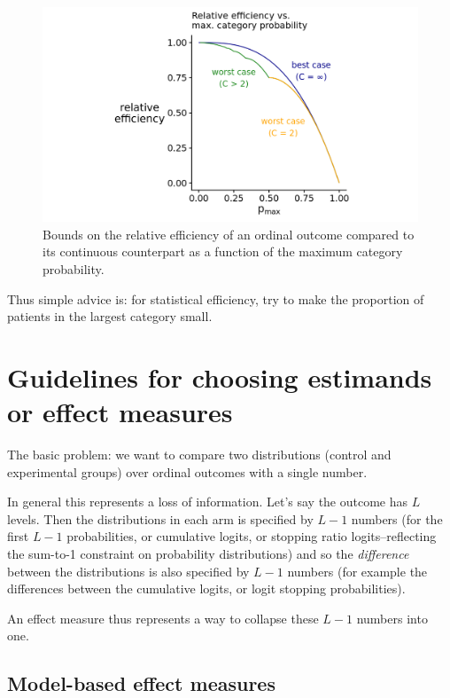 \documentclass[
  11pt,
  fleqn
]{article}
\begin{document}
\begin{figure}
  \includegraphics[width=6in]{p_max_controls_efficiency.png}
  \caption{Bounds on the relative efficiency of an ordinal outcome
    compared to its continuous counterpart as a function of the maximum
  category probability.}
  \label{fig:p_max}
\end{figure}

Thus simple advice is: for statistical efficiency, try to make the proportion
of patients in the largest category small.

\section{Guidelines for choosing estimands or effect measures}

The basic problem: we want to compare two distributions (control and
experimental groups) over ordinal outcomes with a single number.

In general this represents a loss of information. Let's say the
outcome has $L$ levels. Then the distributions in each
arm is specified by $L-1$ numbers (for the first $L-1$ probabilities,
  or cumulative logits, or stopping ratio logits--reflecting the
sum-to-1 constraint on probability distributions) and so the
\emph{difference} between the distributions is also specified by
$L-1$ numbers (for example the differences between the cumulative
logits, or logit stopping probabilities).

An effect measure thus represents a way to collapse these $L-1$
numbers into one.

\subsection{Model-based effect measures}
\end{document}
